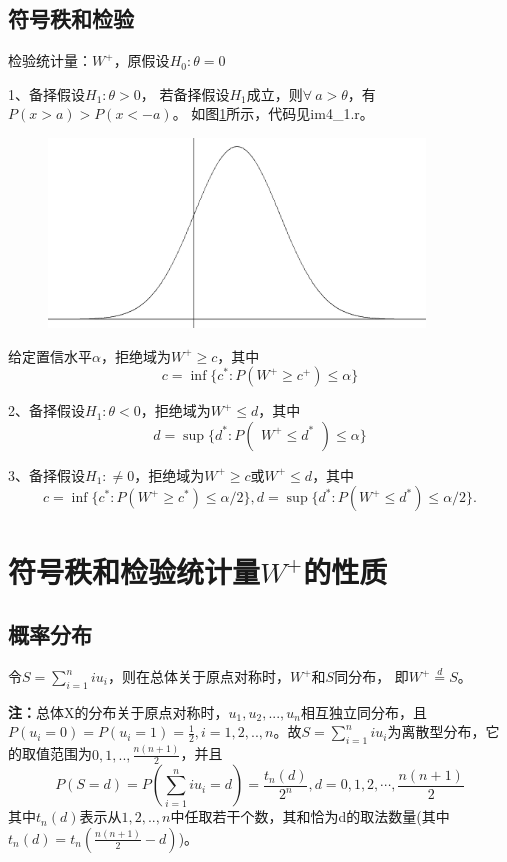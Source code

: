 \documentclass[lang=cn,10pt]{elegantbook}
\begin{document}
\subsection{符号秩和检验}
检验统计量：$W^+$，原假设$H_0:\theta = 0$

1、备择假设$H_1:\theta>0$，
若备择假设$H_1$成立，则$\forall ~a>\theta $，有$P(x>a)>P(x<-a)$。
如图\ref{im4_1}所示，代码见im4\_1.r。

\begin{figure}[hp]
    \centering
    \includegraphics[width = 10cm]{img/im4_1.png}
    \caption{}
    \label{im4_1}
\end{figure}

给定置信水平$\alpha$，拒绝域为$W^+\geq c$，其中
\begin{equation*}
    c=\inf\{c^*:P(W^+\geqslant c^+)\leqslant\alpha\}
\end{equation*}

2、备择假设$H_1:\theta<0$，拒绝域为$W^+\leq d$，其中
\begin{equation*}
    d=\sup\{d^{*}:P(\begin{array}{c}W^{+}\leq d^{*}\\\end{array})\leq\alpha\}
\end{equation*}

3、备择假设$H_1:\neq 0$，拒绝域为$W^+\geq c$或$W^+\leq d$，其中
\begin{equation*}
    c=\inf\{c^*:P(W^+\geqslant c^*)\leqslant\alpha/2\},
    d=\sup\{d^*:P(W^+\leqslant d^*)\leqslant\alpha/2\}.
\end{equation*}

\section{符号秩和检验统计量$W^+$的性质}
\subsection{概率分布}
\begin{proposition}
    令$S=\sum_{i=1}^niu_i$，则在总体关于原点对称时，$W^+$和$S$同分布，
    即$W^+\overset{d}{=}S$。
\end{proposition}
\textbf{注：}总体X的分布关于原点对称时，$u_1,u_2,...,u_n$相互独立同分布，且$P(u_i=0)=P(u_i=1) = \frac12
    ,i=1,2,..,n $。故$S=\sum_{i=1}^{n}iu_i$为离散型分布，它的取值范围为$0,1,..,\frac{n(n+1)}2$，并且
\begin{equation}
    P(S=d)=P(\sum_{i=1}^niu_i=d)=\frac{t_n(d)}{2^n},d=0,1,2,\cdots,\frac{n(n+1)}2
\end{equation}
其中$t_n(d)$表示从$1,2,..,n$中任取若干个数，其和恰为d的取法数量(其中$t_n(d)=t_n(\frac{n(n+1)}{2}-d)$)。
\end{document}
